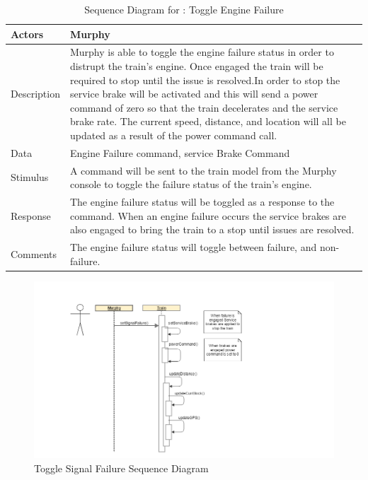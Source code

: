 \documentclass[]{article}
\begin{document}
\begin{table}[H]
	\centering
	\caption{Sequence Diagram for : Toggle Engine Failure}
	\begin{tabular}{|l|l|}
		\hline
		Actors & \parbox[t]{10cm}{Murphy} \\ \hline
		Description & \parbox[t]{10cm}{Murphy is able to toggle the engine failure status in order to distrupt the train's engine. Once engaged the train will be required to stop until the issue is resolved.In order to stop the service brake will be activated and this will send a power command of zero so that the train decelerates and the service brake rate. The current speed, distance, and location will all be updated as a result of the power command call.} \\ \hline
		Data &  \parbox[t]{10cm}{Engine Failure command, service Brake Command} \\ \hline
		Stimulus &  \parbox[t]{10cm}{A command will be sent to the train model from the Murphy console to toggle the failure status of the train's engine.} \\ \hline
		Response & \parbox[t]{10cm}{The engine failure status will be toggled as a response to the command. When an engine failure occurs the service brakes are also engaged to bring the train to a stop until issues are resolved.}\\ \hline
		Comments & \parbox[t]{10cm}{The engine failure status will toggle between failure, and non-failure. }  \\ \hline
	\end{tabular}
\end{table}

\begin{figure}[H]
	\centering
	\includegraphics[scale=.5]{train_model_sqd_toggle_signal_failure.png}
	\caption{Toggle Signal Failure Sequence Diagram}
\end{figure}
\end{document}
